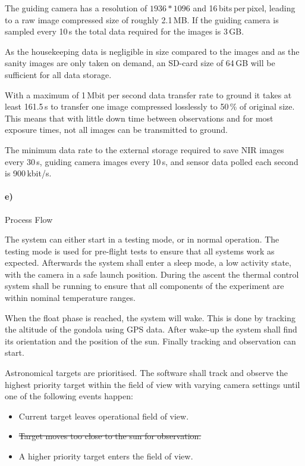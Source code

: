 The guiding camera has a resolution of $1936 * 1096$ and 16\,bits\,per\,pixel, leading to a raw image compressed size of roughly 2.1\,MB. If the guiding camera is sampled every 10\,s the total data required for the images is 3\,GB.

As the housekeeping data is negligible in size compared to the images and as the sanity images are only taken on demand, an SD-card size of 64\,GB will be sufficient for all data storage.

With a maximum of 1\,Mbit per second data transfer rate to ground it takes at least 161.5\,s to transfer one image compressed losslessly to 50\,\% of original size. This means that with little down time between observations and for most exposure times, not all images can be transmitted to ground.

The minimum data rate to the external storage required to save NIR images every 30\,s, guiding camera images every 10\,s, and sensor data polled each second is 900\,kbit/s.


\paragraph{e)} Process Flow

The system can either start in a testing mode, or in normal operation. The testing mode is used for pre-flight tests to ensure that all systems work as expected. Afterwards the system shall enter a sleep mode, a low activity state, with the camera in a safe launch position. During the ascent the thermal control system shall be running to ensure that all components of the experiment are within nominal temperature ranges.

When the float phase is reached, the system will wake. This is done by tracking the altitude of the gondola using GPS data. After wake-up the system shall find its orientation and the position of the sun. Finally tracking and observation can start.

Astronomical targets are prioritised. The software shall track and observe the highest priority target within the field of view with varying camera settings until one of the following events happen:

\begin{itemize}
	\item Current target leaves operational field of view.
	\item \st{Target moves too close to the sun for observation.}
	\item A higher priority target enters the field of view.
\end{itemize}

